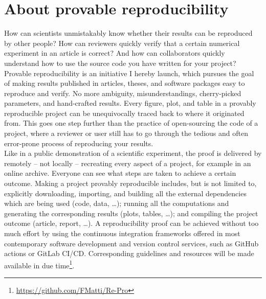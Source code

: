 \chapter*{About provable reproducibility}
\label{chp:0-reproducibility}

How can scientists unmistakably know whether their results can be reproduced
by other people? How can reviewers quickly verify that a certain numerical
experiment in an article is correct? And how can collaborators quickly
understand how to use the source code you have written for your project?\\

Provable reproducibility is an initiative I hereby launch, which pursues the
goal of making results published in articles, theses, and software packages easy to
reproduce and verify. No more ambiguity, misunderstandings, cherry-picked
parameters, and hand-crafted results. Every figure, plot, and table
in a provably reproducible project can be unequivocally traced back to where
it originated from. This goes one step further than the practice of open-sourcing
the code of a project, where a reviewer or user still has to go through the
tedious and often error-prone process of reproducing your results.\\

Like in a public demonstration of a scientific experiment, the proof is delivered
by remotely -- not locally -- recreating every aspect of a project, for example
in an online archive. Everyone can see what steps are taken to achieve a certain outcome.
Making a project provably reproducible includes, but is not limited to,
explicitly downloading, importing, and building all the external dependencies which are being used (code, data, \dots);
running all the computations and generating the corresponding results (plots, tables, \dots);
and compiling the project outcome (article, report, \dots).
A reproducibility proof can be achieved without too much effort by
using the continuous integration frameworks offered in most contemporary
software development and version control services, such as GitHub actions or
GitLab CI/CD. Corresponding guidelines and resources will be made available in due
time\footnote{\url{https://github.com/FMatti/Re-Pro}}.

\begin{center}
    
\end{center}
